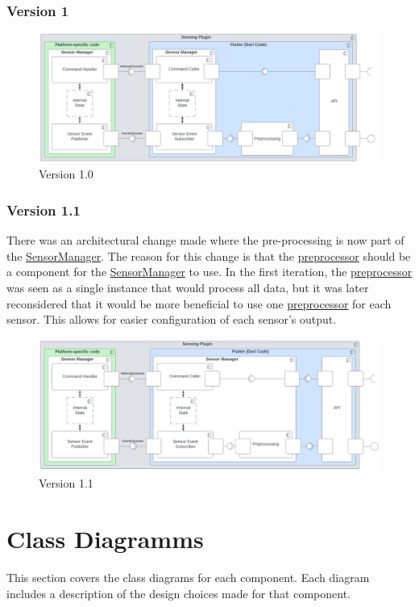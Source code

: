 \documentclass[12pt]{article}
\begin{document}
\subsubsection{Version 1}
\begin{figure}[ht]
\includegraphics[width=1\textwidth]{Graphics/SmartSensingPluginOld.png}
\caption{\label{fig:bild3} Version 1.0}
\end{figure}

\subsubsection{Version 1.1}
There was an architectural change made where the pre-processing is now part of the \hyperref[fig:bild9]{SensorManager}. The reason for this change is that the \hyperref[fig:bild13]{preprocessor} should be a component for the \hyperref[fig:bild9]{SensorManager} to use. In the first iteration, the \hyperref[fig:bild13]{preprocessor} was seen as a single instance that would process all data, but it was later reconsidered that it would be more beneficial to use one \hyperref[fig:bild13]{preprocessor} for each sensor. This allows for easier configuration of each sensor's output.
\begin{figure}[ht]
\includegraphics[width=1\textwidth]{Graphics/SmartSensingPluginNew.png}
\caption{\label{fig:bild4} Version 1.1}
\end{figure}

\newpage
\section{Class Diagramms}
This section covers the class diagrams for each component. Each diagram includes a description of the design choices made for that component.
\end{document}
